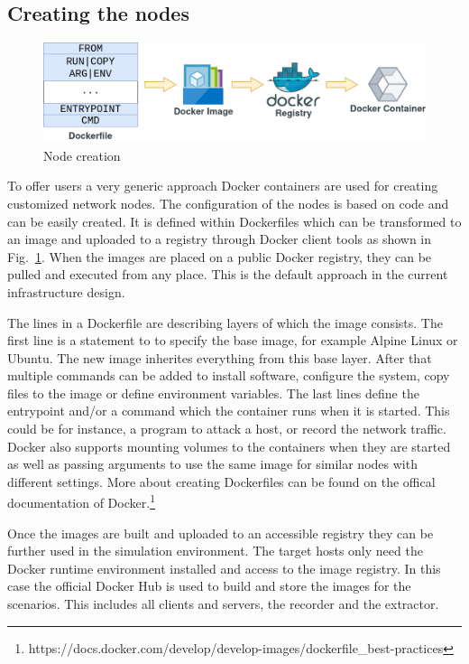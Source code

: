 \documentclass[conference]{IEEEtran}
\begin{document}
\subsection{Creating the nodes}

\begin{figure}[htbp]
\centerline{\includegraphics[scale=0.24]{docker.png}}
\caption{Node creation}
\label{node_creation}
\end{figure}

To offer users a very generic approach Docker containers are used for creating customized network nodes. The configuration of the nodes is based on code and can be easily created. It is defined within Dockerfiles which can be transformed to an image and uploaded to a registry through Docker client tools as shown in Fig.~\ref{node_creation}. When the images are placed on a public Docker registry, they can be pulled and executed from any place. This is the default approach in the current infrastructure design. 

The lines in a Dockerfile are describing layers of which the image consists. The first line is a statement to to specify the base image, for example Alpine Linux or Ubuntu. The new image inherites everything from this base layer. After that multiple commands can be added to install software, configure the system, copy files to the image or define environment variables. The last lines define the entrypoint and/or a command which the container runs when it is started. This could be for instance, a program to attack a host, or record the network traffic. Docker also supports mounting volumes to the containers when they are started as well as passing arguments to use the same image for similar nodes with different settings. More about creating Dockerfiles can be found on the offical documentation of Docker.\footnote{https://docs.docker.com/develop/develop-images/dockerfile\_best-practices} 

Once the images are built and uploaded to an accessible registry they can be further used in the simulation environment. The target hosts only need the Docker runtime environment installed and access to the image registry. In this case the official Docker Hub is used to build and store the images for the scenarios. This includes all clients and servers, the recorder and the extractor.
\end{document}
